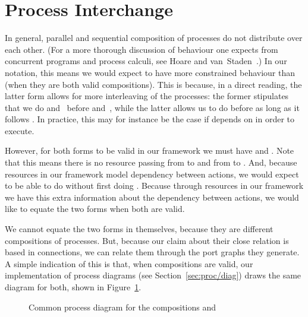 \documentclass[class=smolathesis,crop=false]{standalone}
\begin{document}
\section{Process Interchange}
\label{sec:port_graphs/interchange}

In general, parallel and sequential composition of processes do not distribute over each other.
(For a more thorough discussion of behaviour one expects from concurrent programs and process calculi, see Hoare and van~Staden~\cite{hoare_staden-2014}.)
In our notation, this means we would expect  to have more constrained behaviour than  (when they are both valid compositions).
This is because, in a direct reading, the latter form allows for more interleaving of the processes: the former stipulates that we do  and\  before  and\ , while the latter allows us to do  before  as long as it follows .
In practice, this may for instance be the case if  depends on  in order to execute.

However, for both forms to be valid in our framework we must have  and .
Note that this means there is no resource passing from  to  and from  to .
And, because resources in our framework model dependency between actions, we would expect to be able to do  without first doing .
Because through resources in our framework we have this extra information about the dependency between actions, we would like to equate the two forms when both are valid.

We cannot equate the two forms in themselves, because they are different compositions of processes.
But, because our claim about their close relation is based in connections, we can relate them through the port graphs they generate.
A simple indication of this is that, when  compositions are valid, our implementation of process diagrams (see Section~\ref{sec:proc/diag}) draws the same diagram for both, shown in Figure~\ref{fig:interchange-diag}.

\begin{figure}[hbtp]
  \centering
  
  \caption{Common process diagram for the compositions  and }
  \label{fig:interchange-diag}
\end{figure}
\end{document}
